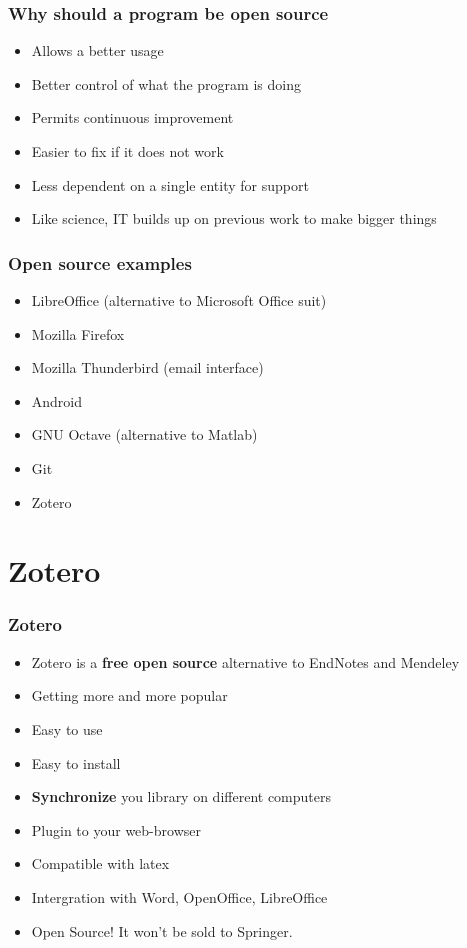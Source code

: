 \documentclass{beamer}
\begin{document}
\begin{frame}
\frametitle{Why should a program be open source}
\begin{itemize}
\item Allows a better usage 
\item Better control of what the program is doing
\item Permits continuous improvement
\item Easier to fix if it does not work
\item Less dependent on a single entity for support
\item Like science, IT builds up on previous work to make bigger things
\end{itemize}
\end{frame}

\begin{frame}
\frametitle{Open source examples}
\begin{itemize}
\item LibreOffice (alternative to Microsoft Office suit)
\item Mozilla Firefox 
\item Mozilla Thunderbird (email interface)
\item Android
\item GNU Octave (alternative to Matlab)
\item Git
\item Zotero
\end{itemize}
\end{frame}


\section{Zotero}
\begin{frame}
\frametitle{Zotero}
\begin{itemize}
\item Zotero is a \textbf{free open source} alternative to EndNotes and Mendeley
\item Getting more and more popular
\item Easy to use
\item Easy to install
\item \textbf{Synchronize} you library on different computers
\item Plugin to your web-browser
\item Compatible with latex
\item Intergration with Word, OpenOffice, LibreOffice
\item Open Source! It won't be sold to Springer.
\end{itemize}
\end{frame}
\end{document}
